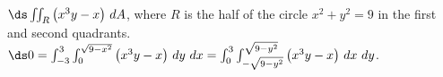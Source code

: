 {$\ds \iint_R \big(x^3y-x\big)\ dA$, where $R$ is the half of the circle $x^2+y^2=9$ in the first and second quadrants.
}
{$\ds0 = \int_{-3}^3\int_{0}^{\sqrt{9-x^2}}\big(x^3y-x\big)\ dy\ dx = \int_{0}^3\int_{-\sqrt{9-y^2}}^{\sqrt{9-y^2}}\big(x^3y-x\big)\ dx\ dy$.
}